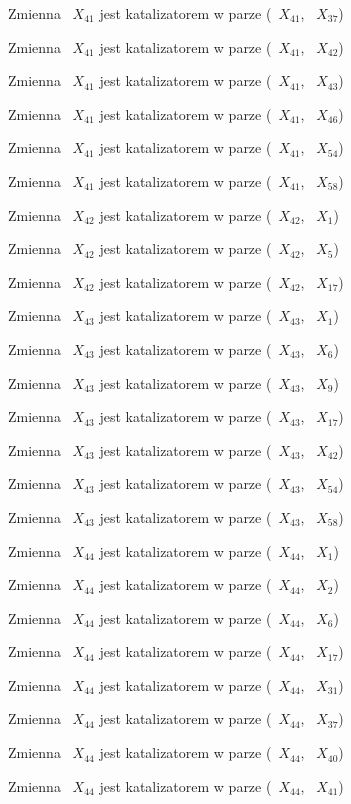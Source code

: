 \documentclass{article}
\begin{document}
Zmienna ~$X_{41}$ jest katalizatorem w parze (~$X_{41}$, ~$X_{37}$)

Zmienna ~$X_{41}$ jest katalizatorem w parze (~$X_{41}$, ~$X_{42}$)

Zmienna ~$X_{41}$ jest katalizatorem w parze (~$X_{41}$, ~$X_{43}$)

Zmienna ~$X_{41}$ jest katalizatorem w parze (~$X_{41}$, ~$X_{46}$)

Zmienna ~$X_{41}$ jest katalizatorem w parze (~$X_{41}$, ~$X_{54}$)

Zmienna ~$X_{41}$ jest katalizatorem w parze (~$X_{41}$, ~$X_{58}$)

Zmienna ~$X_{42}$ jest katalizatorem w parze (~$X_{42}$, ~$X_{1}$)

Zmienna ~$X_{42}$ jest katalizatorem w parze (~$X_{42}$, ~$X_{5}$)

Zmienna ~$X_{42}$ jest katalizatorem w parze (~$X_{42}$, ~$X_{17}$)

Zmienna ~$X_{43}$ jest katalizatorem w parze (~$X_{43}$, ~$X_{1}$)

Zmienna ~$X_{43}$ jest katalizatorem w parze (~$X_{43}$, ~$X_{6}$)

Zmienna ~$X_{43}$ jest katalizatorem w parze (~$X_{43}$, ~$X_{9}$)

Zmienna ~$X_{43}$ jest katalizatorem w parze (~$X_{43}$, ~$X_{17}$)

Zmienna ~$X_{43}$ jest katalizatorem w parze (~$X_{43}$, ~$X_{42}$)

Zmienna ~$X_{43}$ jest katalizatorem w parze (~$X_{43}$, ~$X_{54}$)

Zmienna ~$X_{43}$ jest katalizatorem w parze (~$X_{43}$, ~$X_{58}$)

Zmienna ~$X_{44}$ jest katalizatorem w parze (~$X_{44}$, ~$X_{1}$)

Zmienna ~$X_{44}$ jest katalizatorem w parze (~$X_{44}$, ~$X_{2}$)

Zmienna ~$X_{44}$ jest katalizatorem w parze (~$X_{44}$, ~$X_{6}$)

Zmienna ~$X_{44}$ jest katalizatorem w parze (~$X_{44}$, ~$X_{17}$)

Zmienna ~$X_{44}$ jest katalizatorem w parze (~$X_{44}$, ~$X_{31}$)

Zmienna ~$X_{44}$ jest katalizatorem w parze (~$X_{44}$, ~$X_{37}$)

Zmienna ~$X_{44}$ jest katalizatorem w parze (~$X_{44}$, ~$X_{40}$)

Zmienna ~$X_{44}$ jest katalizatorem w parze (~$X_{44}$, ~$X_{41}$)
\end{document}
